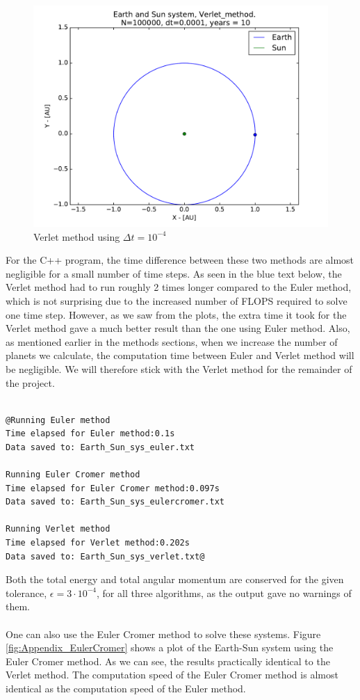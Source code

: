 \documentclass{article}
\begin{document}
\begin{figure}[!h]
\centering
\includegraphics[width=\linewidth]{Plots/Earth_Sun_Verlet_method.pdf}
\caption{Verlet method using $\Delta t = 10^{-4}$}
\label{fig:balle2}
\end{figure}
For the C++ program, the time difference between these two methods are almost negligible for a small number of time steps. As seen in the blue text below, the Verlet method had to run roughly 2 times longer compared to the Euler method, which is not surprising due to the increased number of FLOPS required to solve one time step. However, as we saw from the plots, the extra time it took for the Verlet method gave a much better result than the one using Euler method. Also, as mentioned earlier in the methods sections, when we increase the number of planets we calculate, the computation time between Euler and Verlet method will be negligible. We will therefore stick with the Verlet method for the remainder of the project. \\\\
\begin{lstlisting}
@Running Euler method
Time elapsed for Euler method:0.1s
Data saved to: Earth_Sun_sys_euler.txt

Running Euler Cromer method
Time elapsed for Euler Cromer method:0.097s
Data saved to: Earth_Sun_sys_eulercromer.txt

Running Verlet method
Time elapsed for Verlet method:0.202s
Data saved to: Earth_Sun_sys_verlet.txt@
\end{lstlisting}
Both the total energy and total angular momentum are conserved for the given tolerance, $\epsilon = 3\cdot 10^{-4}$, for all three algorithms, as the output gave no warnings of them. \\\\
One can also use the Euler Cromer method to solve these systems. Figure \ref{fig:Appendix_EulerCromer} shows a plot of the Earth-Sun system using the Euler Cromer method. As we can see, the results practically identical to the Verlet method. The computation speed of the Euler Cromer method is almost identical as the computation speed of the Euler method.
\end{document}
